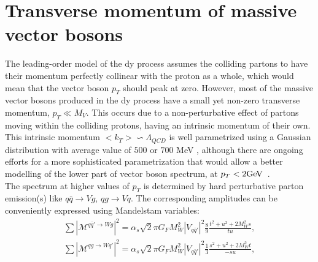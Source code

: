 	
		 \section{Transverse momentum of massive vector bosons }
		 The leading-order model of the \gls{dy} process assumes the colliding partons to have their momentum perfectly collinear with the proton as a whole, which would mean that the vector boson $p_T$ should peak at zero. However, most of the massive vector bosons produced in the \gls{dy} process have a small yet non-zero transverse momentum, $p_T \ll M_V$. This occurs due to a non-perturbative effect of partons moving within the colliding protons, having an intrinsic momentum of their own. This intrinsic momentum $<k_T>\backsim \Lambda_{QCD}$ is well parametrized using a Gaussian distribution with average value of $500$ \cite{PhysRevD.100.074027} or $700$ MeV  \cite{Ellis:1991qj}, although there are ongoing efforts for a more sophisticated parametrization that would allow a better modelling of the lower part of vector boson spectrum, at $p_T<2\text{Ge\kern -0.1em V}$~\cite{HAUTMANN2020135478}. \\
		 The spectrum at higher values of $p_T$ is determined by hard perturbative parton emission(s) like $q\bar q \rightarrow Vg$, $qg \rightarrow Vq$. The corresponding amplitudes can be conveniently expressed using Mandelstam variables:
	\begin{equation}
	\begin{array}{lcl} 
	\label{eq::xsec_nlo}
		 \sum |\mathcal{M}^{q\bar q'\rightarrow Wg}|^2= \alpha_s \sqrt{2}\pi G_F M^2_W |V_{q\bar q'}|^2 \frac{8}{9}\frac{t^2+u^2+2M_W^2s}{tu},\\
		 \sum |\mathcal{M}^{qg\rightarrow Wq'}|^2= \alpha_s \sqrt{2}\pi G_F M^2_W |V_{q\bar q'}|^2 \frac{1}{3}\frac{s^2+u^2+2M_W^2t}{-su},
		 \end{array}
	 \end{equation}	
		

